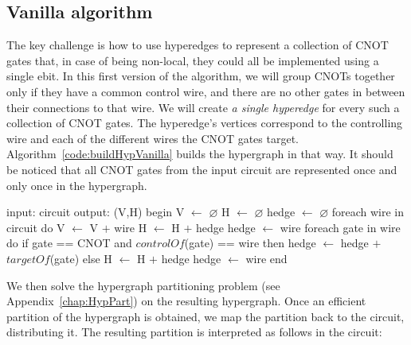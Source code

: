 \subsection{Vanilla algorithm}
\label{Vanilla}

The key challenge is how to use hyperedges to represent a collection of CNOT gates that, in case of being non-local, they could all be implemented using a single ebit. In this first version of the algorithm, we will group CNOTs together only if they have a common control wire, and there are no other gates in between their connections to that wire. We will create \textit{a single hyperedge} for every such a collection of CNOT gates. The hyperedge's vertices correspond to the controlling wire and each of the different wires the CNOT gates target. Algorithm~\ref{code:buildHypVanilla} builds the hypergraph in that way. It should be noticed that all CNOT gates from the input circuit are represented once and only once in the hypergraph. %

\begin{algorithm}[caption={Builds the hypergraph of a given circuit. \(H\) may contain multiple hyperedges connecting the same vertices.}, label={code:buildHypVanilla}]
input: circuit
output: (V,H)
begin
  V $\gets$ $\varnothing$
  H $\gets$ $\varnothing$
  hedge $\gets$ $\varnothing$
  foreach wire in circuit do
    V $\gets$ V $+$ {wire}
    H $\gets$ H $+$ {hedge}
    hedge $\gets$ {wire}
    foreach gate in wire do
      if gate == CNOT and $controlOf$(gate) == wire then
        hedge $\gets$ hedge $+$ {$targetOf$(gate)}
      else
        H $\gets$ H $+$ {hedge}
        hedge $\gets$ {wire}
end
\end{algorithm}


We then solve the hypergraph partitioning problem (see Appendix~\ref{chap:HypPart}) on the resulting hypergraph. Once an efficient partition of the hypergraph is obtained, we map the partition back to the circuit, distributing it. The resulting partition is interpreted as follows in the circuit:

